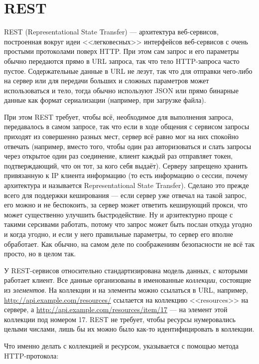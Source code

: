 \documentclass[a5paper]{article}
\begin{document}
\section{REST}

REST (Representational State Transfer) --- архитектура веб-сервисов, построенная вокруг идеи <<легковесных>> интерфейсов веб-сервисов с очень простыми протоколами поверх HTTP. При этом сам запрос и его параметры обычно передаются прямо в URL запроса, так что тело HTTP-запроса часто пустое. Содержательные данные в URL не лезут, так что для отправки чего-либо на сервер или для передачи больших и сложных параметров может использоваться и тело, тогда обычно используют JSON или прямо бинарные данные как формат сериализации (например, при загрузке файла).

При этом REST требует, чтобы всё, необходимое для выполнения запроса, передавалось в самом запросе, так что если в ходе общения с сервисом запросы приходят из совершенно разных мест, сервер всё равно мог на них спокойно отвечать (например, вместо того, чтобы один раз авторизоваться и слать запросы через открытое один раз соединение, клиент каждый раз отправляет токен, подтверждающий, что он тот, за кого себя выдаёт). Серверу запрещено хранить привязанную к IP клиента информацию (то есть информацию о сессии, почему архитектура и называется Representational State Transfer). Сделано это прежде всего для поддержки кеширования --- если сервер уже отвечал на такой запрос, его можно и не беспокоить, за сервер может ответить кеширующий прокси, что может существенно улучшить быстродействие. Ну и арзитектурно проще с такими серсивами работать, потому что запрос может быть послан откуда угодно и когда угодно, и если у него правильные параметры, то сервер его вполне обработает. Как обычно, на самом деле по соображениям безопасности не всё так просто, но в целом так.

У REST-сервисов относительно стандартизирована модель данных, с которыми работает клиент. Все данные организованы в именованные \textit{коллекции}, состоящие из \textit{элементов}. На коллекции и на элементы можно ссылаться в URL, например, \url{http://api.example.com/resources/} ссылается на коллекцию <<resources>> на сервере, а \url{http://api.example.com/resources/item/17} --- на элемент этой коллекции под номером 17. REST не требует, чтобы ресурсы нумеровались целыми числами, лишь бы их можно было как-то идентифицировать в коллекции.

Что именно делать с коллекцией и ресурсом, указывается с помощью метода HTTP-протокола:
\end{document}
